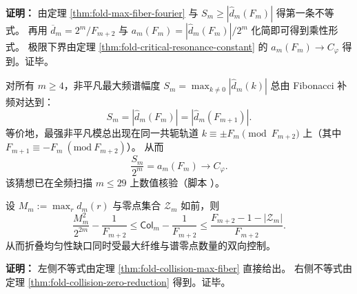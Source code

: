 \textbf{证明：}
由定理 \ref{thm:fold-max-fiber-fourier} 与 \(S_m\ge |\widehat d_m(F_m)|\) 得第一条不等式。
再用 \(\overline d_m=2^m/F_{m+2}\) 与 \(a_m(F_m)=|\widehat d_m(F_m)|/2^m\) 化简即可得到乘性形式。
极限下界由定理 \ref{thm:fold-critical-resonance-constant} 的 \(a_m(F_m)\to C_\varphi\) 得到。证毕。

\begin{conjecture}\label{conj:fold-fourier-fibonacci-extremizer}
对所有 \(m\ge 4\)，非平凡最大频谱幅度
\(
S_m=\max_{k\ne 0}|\widehat d_m(k)|
\)
总由 Fibonacci 补频对达到：
\[
S_m=|\widehat d_m(F_m)|=|\widehat d_m(F_{m+1})|.
\]
等价地，最强非平凡模总出现在同一共轭轨道
\(
k\equiv\pm F_m\pmod{F_{m+2}}
\)
上（其中 \(F_{m+1}\equiv -F_m\ (\mathrm{mod}\ F_{m+2})\)）。
从而
\[
\frac{S_m}{2^m}=a_m(F_m)\longrightarrow C_\varphi.
\]
该猜想已在全频扫描 \(m\le 29\) 上数值核验（脚本 ）。
\end{conjecture}

\begin{theorem}[碰撞缺口的双向夹逼]
\label{thm:fold-collision-sandwich}
设 $M_m:=\max_r d_m(r)$ 与零点集合 $\mathcal{Z}_m$ 如前，则
\[
\frac{M_m^2}{2^{2m}}-\frac{1}{F_{m+2}}
\le
\mathsf{Col}_m-\frac{1}{F_{m+2}}
\le
\frac{F_{m+2}-1-|\mathcal{Z}_m|}{F_{m+2}}.
\]
从而折叠均匀性缺口同时受最大纤维与谱零点数量的双向控制。
\end{theorem}

\textbf{证明：}
左侧不等式由定理 \ref{thm:fold-collision-max-fiber} 直接给出。
右侧不等式由定理 \ref{thm:fold-collision-zero-reduction} 得到。证毕。

